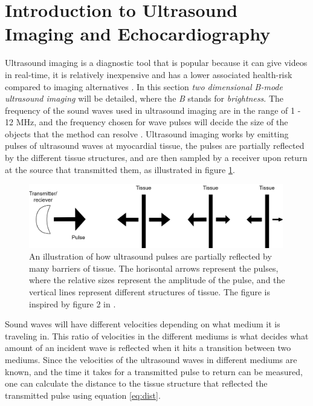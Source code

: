 \section{Introduction to Ultrasound Imaging and Echocardiography}

Ultrasound imaging is a diagnostic tool that is popular because it can give videos in real-time, it is relatively inexpensive and has a lower associated health-risk compared to imaging alternatives \cite{medical_ultrasound_wikipedia}. In this section \textit{two dimensional B-mode ultrasound imaging} will be detailed, where the \textit{B} stands for \textit{brightness}. The frequency of the sound waves used in ultrasound imaging are in the range of 1 - 12 MHz, and the frequency chosen for wave pulses will decide the size of the objects that the method can resolve \cite{basic_ultrasound}. Ultrasound imaging works by emitting pulses of ultrasound waves at myocardial tissue, the pulses are partially reflected by the different tissue structures, and are then sampled by a receiver upon return at the source that transmitted them, as illustrated in figure \ref{fig:us_reflect}.

\begin{figure}[H]
    \centering
    \includegraphics[width=0.99\textwidth]{echocardiography/US_reflection.png}
    \caption{An illustration of how ultrasound pulses are partially reflected by many barriers of tissue. The horisontal arrows represent the pulses, where the relative sizes represent the amplitude of the pulse, and the vertical lines represent different structures of tissue. The figure is inspired by figure 2 in \cite{basic_ultrasound}.}
    \label{fig:us_reflect}
\end{figure}

Sound waves will have different velocities depending on what medium it is traveling in. This ratio of velocities in the different mediums is what decides what amount of an incident wave is reflected when it hits a transition between two mediums. Since the velocities of the ultrasound waves in different mediums are known, and the time it takes for a transmitted pulse to return can be measured, one can calculate the distance to the tissue structure that reflected the transmitted pulse using equation \eqref{eq:dist}. 

